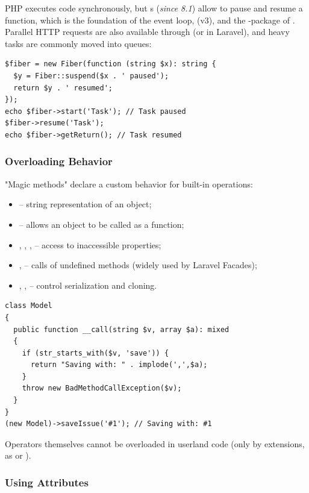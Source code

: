 PHP executes code synchronously, but s (\emph{since 8.1}) allow to pause and resume a
function, which is the foundation of the  event loop,  (v3), and the
-package of . Parallel HTTP requests are also available
through  (or  in Laravel), and heavy tasks are commonly moved into
queues:

\begin{lstlisting}
$fiber = new Fiber(function (string $x): string {
  $y = Fiber::suspend($x . ' paused');
  return $y . ' resumed';
});
echo $fiber->start('Task'); // Task paused
$fiber->resume('Task');
echo $fiber->getReturn(); // Task resumed
\end{lstlisting}


\subsubsection{Overloading Behavior}

"Magic methods" declare a custom behavior for built-in operations:

\begin{itemize}
  \item {} -- string representation of an object;
  \item {} -- allows an object to be called as a function;
  \item {}, , ,  -- access to inaccessible
  properties;
  \item {},  -- calls of undefined methods
  (widely used by Laravel Facades);
  \item {}, ,  -- control serialization and
  cloning.
\end{itemize}

\begin{lstlisting}
class Model
{
  public function __call(string $v, array $a): mixed
  {
    if (str_starts_with($v, 'save')) {
      return "Saving with: " . implode(',',$a);
    }
    throw new BadMethodCallException($v);
  }
}
(new Model)->saveIssue('#1'); // Saving with: #1
\end{lstlisting}

\noindent Operators themselves cannot be overloaded in userland code (only by extensions, as
 or ).


\subsubsection{Using Attributes}


